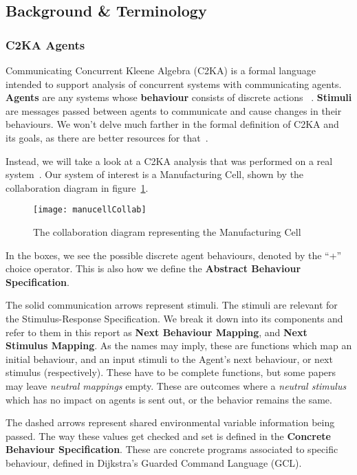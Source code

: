 \subsection{Background \& Terminology}\label{subsec:background-&-terminology}
\subsubsection{C2KA Agents}\label{subsubsec:c2ka-agents}
Communicating Concurrent Kleene Algebra (C2KA) is a formal language intended to support analysis of concurrent systems with communicating agents. %
\textbf{Agents} are any systems whose \textbf{behaviour} consists of discrete actions ~\cite{c2ka_foundations}.
\textbf{Stimuli} are messages passed between agents to communicate and cause changes in their behaviours.
We won't delve much farther in the formal definition of C2KA and its goals,
as there are better resources for that~\cite{c2ka_foundations, implicit_interactions}.

Instead, we will take a look at a C2KA analysis that was performed on a real system~\cite{manu_cell}.
Our system of interest is a Manufacturing Cell, shown by the collaboration diagram in figure~\ref{fig:manucell-collab}.
\begin{figure}
    \centering
    \texttt{[image: manucellCollab]}
    \caption{The collaboration diagram representing the Manufacturing Cell}
    \label{fig:manucell-collab}
\end{figure}

In the boxes, we see the possible discrete agent behaviours, denoted by the ``+'' choice operator.
This is also how we define the \textbf{Abstract Behaviour Specification}. %

The solid communication arrows represent stimuli.
The stimuli are relevant for the Stimulus-Response Specification. %
We break it down into its components and refer to them in this report as \textbf{Next Behaviour Mapping}, and \textbf{Next Stimulus Mapping}.
As the names may imply, these are functions which map an initial behaviour, and an input stimuli to the Agent's next behaviour, or next stimulus (respectively).
These have to be complete functions, but some papers may leave \textit{neutral mappings} empty.
These are outcomes where a \textit{neutral stimulus} which has no impact on agents is sent out, or the behavior remains the same.

The dashed arrows represent shared environmental variable information being passed.
The way these values get checked and set is defined in the \textbf{Concrete Behaviour Specification}. %
These are concrete programs associated to specific behaviour, defined in Dijkstra's Guarded Command Language (GCL).

